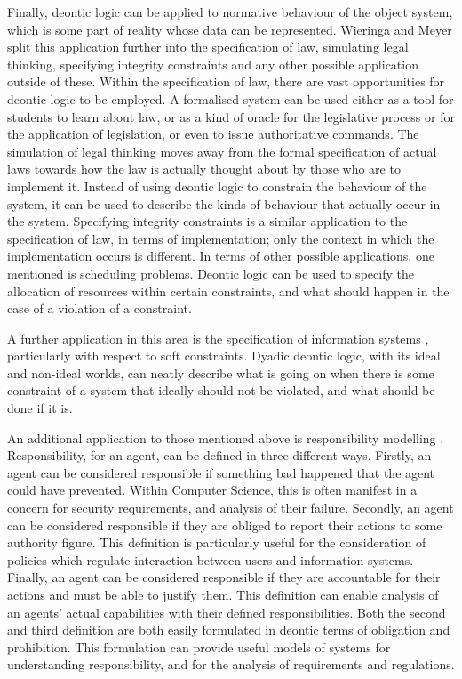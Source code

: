 \documentclass{l4proj}
\begin{document}
Finally, deontic logic can be applied to normative behaviour of the object system, which is some part of reality whose data can be represented. Wieringa and Meyer split this application further into the specification of law, simulating legal thinking, specifying integrity constraints and any other possible application outside of these. Within the specification of law, there are vast opportunities for deontic logic to be employed. A formalised system can be used either as a tool for students to learn about law, or as a kind of oracle for the legislative process or for the application of legislation, or even to issue authoritative commands. The simulation of legal thinking moves away from the formal specification of actual laws towards how the law is actually thought about by those who are to implement it. Instead of using deontic logic to constrain the behaviour of the system, it can be used to describe the kinds of behaviour that actually occur in the system. Specifying integrity constraints is a similar application to the specification of law, in terms of implementation; only the context in which the implementation occurs is different. In terms of other possible applications, one mentioned is scheduling problems. Deontic logic can be used to specify the allocation of resources within certain constraints, and what should happen in the case of a violation of a constraint. 

A further application in this area is the specification of information systems \cite{infosystems}, particularly with respect to soft constraints. Dyadic deontic logic, with its ideal and non-ideal worlds, can neatly describe what is going on when there is some constraint of a system that ideally should not be violated, and what should be done if it is. %

An additional application to those mentioned above is responsibility modelling \cite{responsibility}. Responsibility, for an agent, can be defined in three different ways. Firstly, an agent can be considered responsible if something bad happened that the agent could have prevented. Within Computer Science, this is often manifest in a concern for security requirements, and analysis of their failure. Secondly, an agent can be considered responsible if they are obliged to report their actions to some authority figure. This definition is particularly useful for the consideration of policies which regulate interaction between users and information systems. Finally, an agent can be considered responsible if they are accountable for their actions and must be able to justify them. This definition can enable analysis of an agents' actual capabilities with their defined responsibilities. Both the second and third definition are both easily formulated in deontic terms of obligation and prohibition. This formulation can provide useful models of systems for understanding responsibility, and for the analysis of requirements and regulations. 
\end{document}
